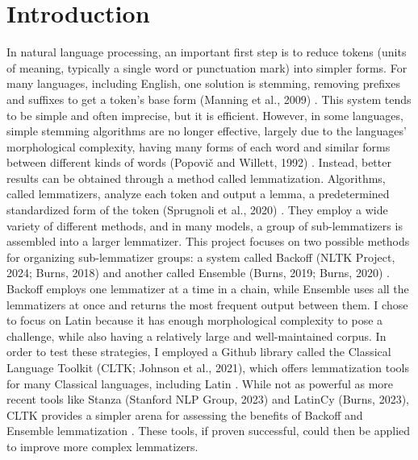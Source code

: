 \documentclass[11pt]{article}
\begin{document}
\section{Introduction}
In natural language processing, an important first step is to reduce tokens (units of meaning, typically a single word or punctuation mark) into simpler forms. For many languages, including English, one solution is stemming, removing prefixes and suffixes to get a token’s base form (Manning et al., 2009) \cite{info_retrieval}. This system tends to be simple and often imprecise, but it is efficient. However, in some languages, simple stemming algorithms are no longer effective, largely due to the languages’ morphological complexity, having many forms of each word and similar forms between different kinds of words (Popovi\v{c} and Willett, 1992) \cite{stemming_effectiveness}. Instead, better results can be obtained through a method called lemmatization. Algorithms, called lemmatizers, analyze each token and output a lemma, a predetermined standardized form of the token (Sprugnoli et al., 2020) \cite{sprugnoli_lemmatization}. They employ a wide variety of different methods, and in many models, a group of sub-lemmatizers is assembled into a larger lemmatizer. This project focuses on two possible methods for organizing sub-lemmatizer groups: a system called Backoff (NLTK Project, 2024; Burns, 2018) and another called Ensemble (Burns, 2019; Burns, 2020) \cite{nltk_proj} \cite{philological} \cite{multiplex} \cite{ensemble}. Backoff employs one lemmatizer at a time in a chain, while Ensemble uses all the lemmatizers at once and returns the most frequent output between them. I chose to focus on Latin because it has enough morphological complexity to pose a challenge, while also having a relatively large and well-maintained corpus. In order to test these strategies, I employed a Github library called the Classical Language Toolkit (CLTK; Johnson et al., 2021), which offers lemmatization tools for many Classical languages, including Latin \cite{johnson-etal-2021-classical}. While not as powerful as more recent tools like Stanza (Stanford NLP Group, 2023) and LatinCy (Burns, 2023), CLTK provides a simpler arena for assessing the benefits of Backoff and Ensemble lemmatization \cite{stanford_nlp_stanza} \cite{latincy}. These tools, if proven successful, could then be applied to improve more complex lemmatizers. 
\end{document}
